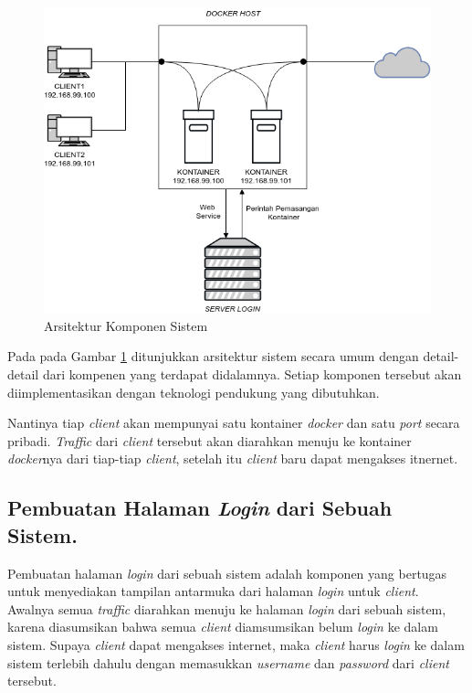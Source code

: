       \begin{figure}[H]
        \centering
        \includegraphics[width=\linewidth]{images/bab3/DIAGRAM1}
        \caption{Arsitektur Komponen Sistem}
        \label{Arsitektur Komponen Sistem}
      \end{figure}
      
    \indent Pada pada Gambar \ref{Arsitektur Komponen Sistem} ditunjukkan arsitektur sistem secara umum dengan detail-detail dari kompenen yang terdapat didalamnya. Setiap komponen tersebut akan diimplementasikan dengan teknologi pendukung yang dibutuhkan.
    
    Nantinya tiap \textit{client}  akan mempunyai satu kontainer \textit{docker} dan satu \textit{port} secara pribadi. \textit{Traffic} dari \textit{client} tersebut akan diarahkan menuju ke kontainer \textit{docker}nya dari tiap-tiap \textit{client}, setelah itu \textit{client} baru dapat mengakses itnernet.
    
    \subsection{Pembuatan Halaman \textit{Login} dari Sebuah Sistem.}
    Pembuatan halaman \textit{login} dari sebuah sistem adalah komponen yang bertugas untuk menyediakan tampilan antarmuka dari halaman \textit{login} untuk \textit{client}. Awalnya semua \textit{traffic} diarahkan menuju ke halaman \textit{login} dari sebuah sistem, karena diasumsikan bahwa semua \textit{client} diamsumsikan belum \textit{login} ke dalam sistem. Supaya \textit{client} dapat mengakses internet, maka \textit{client} harus \textit{login} ke dalam sistem terlebih dahulu dengan memasukkan \textit{username} dan \textit{password} dari \textit{client} tersebut.
    
